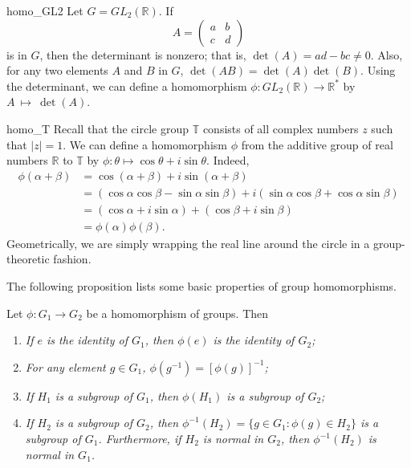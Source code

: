  
\begin{example}{homo_GL2}
Let $G = GL_2( {\mathbb R })$. If
\[
A=
\begin{pmatrix}
a & b \\
c & d
\end{pmatrix}
\]
is in $G$, then the determinant is  nonzero; that is, $\det(A) = ad -bc
\neq 0$.  Also, for any two elements $A$ and $B$ in $G$, $\det(AB) =
\det(A) \det(B)$. Using the determinant, we can define a homomorphism
$\phi : GL_2( {\mathbb R }) \rightarrow {\mathbb R}^\ast$ by
$A~\mapsto~\det(A)$.  
\mbox{\vspace{1in}}
\end{example}
 
 
\begin{example}{homo_T}
Recall that the circle group ${ \mathbb T}$ consists of all complex
numbers $z$ such that $|z|=1$. We can define a homomorphism $\phi$
from the additive group of real numbers ${\mathbb R}$ to ${\mathbb T}$ by
$\phi : \theta \mapsto \cos \theta + i \sin \theta$. Indeed, 
\begin{align*}
\phi( \alpha + \beta )
& =
\cos( \alpha + \beta ) + i \sin( \alpha + \beta ) \\
& =
(\cos \alpha \cos \beta - \sin \alpha \sin \beta)  + i( \sin \alpha 
\cos \beta + \cos \alpha \sin \beta ) \\
& =
(\cos \alpha + i \sin \alpha ) + (\cos \beta + i \sin \beta
) \\
& = \phi( \alpha ) \phi( \beta ).
\end{align*}
Geometrically, we are simply wrapping the real line around the circle 
in a group-theoretic fashion. 
\end{example}

 
The following proposition lists some basic properties of group
homomorphisms.
 
 
\begin{proposition}\label{HomorphismSubgroupProp}
Let $\phi : G_1 \rightarrow G_2$ be a homomorphism of groups. Then 
\begin{enumerate}
 
\rm \item \it
If $e$ is the identity of $G_1$, then $\phi( e)$ is the identity of
$G_2$;  
 
\rm \item \it
For any element $g \in G_1$, $\phi( g^{-1}) = [\phi( g )]^{- 1}$;
 
\rm \item \it
If $H_1$ is a subgroup of $G_1$, then $\phi( H_1 )$ is a subgroup of
$G_2$;
 
\rm \item \it
If $H_2$ is a  subgroup of $G_2$, then $\phi^{-1}(H_2) = \{ g \in G _1:
\phi(g) \in H_2 \}$ is a subgroup of $G_1$. Furthermore, if $H_2$ is
normal in $G_2$, then $\phi^{-1}(H_2)$ is normal in $G_1$. 

 
\end{enumerate}
\end{proposition}
 
